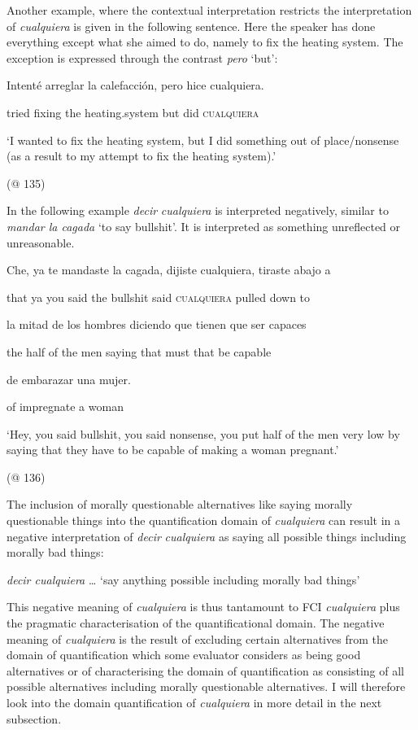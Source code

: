 \documentclass[output=paper]{langscibook}
\begin{document}
Another example, where the contextual interpretation restricts the interpretation of \textit{cualquiera} is given in the following sentence. Here the speaker has done everything except what she aimed to do, namely to fix the heating system. The exception is expressed through the contrast \textit{pero} ‘but’:

    Intenté  arreglar  la  calefacción,  pero  hice  cualquiera.

    tried  fixing  the  heating.system  but  did  \textsc{cualquiera}

    ‘I wanted to fix the heating system, but I did something out of place/nonsense (as a result to my attempt to fix the heating system).’

    (@ 135)

In the following example \textit{decir} \textit{cualquiera} is interpreted negatively, similar to \textit{mandar la cagada} ‘to say bullshit’. It is interpreted as something unreflected or unreasonable. 

    Che,  ya  te  mandaste  la  cagada,  dijiste  cualquiera,  tiraste  abajo  a

    that  ya  you  said  the  bullshit  said  \textsc{cualquiera}  pulled  down  to

    la  mitad  de  los  hombres  diciendo  que  tienen  que  ser  capaces

    the  half  of  the  men  saying  that  must  that  be  capable

    de  embarazar  una   mujer.

    of  impregnate  a  woman

    ‘Hey, you said bullshit, you said nonsense, you put half of the men very low by saying that they have to be capable of making a woman pregnant.’

    (@ 136)

The inclusion of morally questionable alternatives like saying morally questionable things into the quantification domain of \textit{cualquiera} can result in a negative interpretation of \textit{decir} \textit{cualquiera} as saying all possible things including morally bad things:

    \textit{decir cualquiera} … ‘say anything possible including morally bad things’

This negative meaning of \textit{cualquiera} is thus tantamount to FCI \textit{cualquiera} plus the pragmatic characterisation of the quantificational domain. The negative meaning of \textit{cualquiera} is the result of excluding certain alternatives from the domain of quantification which some evaluator considers as being good alternatives or of characterising the domain of quantification as consisting of all possible alternatives including morally questionable alternatives. I will therefore look into the domain quantification of \textit{cualquiera} in more detail in the next subsection. 
\end{document}
